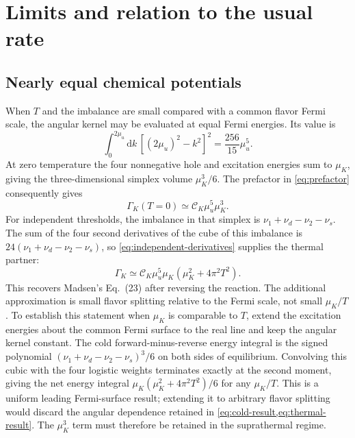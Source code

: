 \documentclass[11pt,letterpaper]{article}
\numberwithin{equation}{section}
\newcommand{\dd}{\mathrm d}
\newcommand{\CK}{\mathcal C_K}
\begin{document}


\section{Limits and relation to the usual rate}
\label{sec:limits}
\subsection{Nearly equal chemical potentials}
When \(T\) and the imbalance are small compared with a common flavor Fermi scale, the angular kernel may be evaluated at equal Fermi energies.
Its value is
\begin{equation}
 \int_0^{2\mu_u}\dd k\,[(2\mu_u)^2-k^2]^2
 =\frac{256}{15}\mu_u^5.
 \label{eq:equal-angular}
\end{equation}
At zero temperature the four nonnegative hole and excitation energies sum to \(\mu_K\), giving the three-dimensional simplex volume \(\mu_K^3/6\).
The prefactor in \cref{eq:prefactor} consequently gives
\begin{equation}
 \Gamma_K(T=0)\simeq\CK\mu_u^5\mu_K^3.
 \label{eq:equal-cold}
\end{equation}
For independent thresholds, the imbalance in that simplex is \(\nu_1+\nu_d-\nu_2-\nu_s\).
The sum of the four second derivatives of the cube of this imbalance is \(24(\nu_1+\nu_d-\nu_2-\nu_s)\), so \cref{eq:independent-derivatives} supplies the thermal partner:
\begin{equation}
 \Gamma_K\simeq\CK\mu_u^5\mu_K(\mu_K^2+4\pi^2T^2).
 \label{eq:madsen23}
\end{equation}
This recovers Madsen's Eq.~(23) after reversing the reaction.
The additional approximation is small flavor splitting relative to the Fermi scale, not small \(\mu_K/T\).
To establish this statement when \(\mu_K\) is comparable to \(T\), extend the excitation energies about the common Fermi surface to the real line and keep the angular kernel constant.
The cold forward-minus-reverse energy integral is the signed polynomial \((\nu_1+\nu_d-\nu_2-\nu_s)^3/6\) on both sides of equilibrium.
Convolving this cubic with the four logistic weights terminates exactly at the second moment, giving the net energy integral \(\mu_K(\mu_K^2+4\pi^2T^2)/6\) for any \(\mu_K/T\).
This is a uniform leading Fermi-surface result; extending it to arbitrary flavor splitting would discard the angular dependence retained in \cref{eq:cold-result,eq:thermal-result}.
The \(\mu_K^3\) term must therefore be retained in the suprathermal regime.
\end{document}
